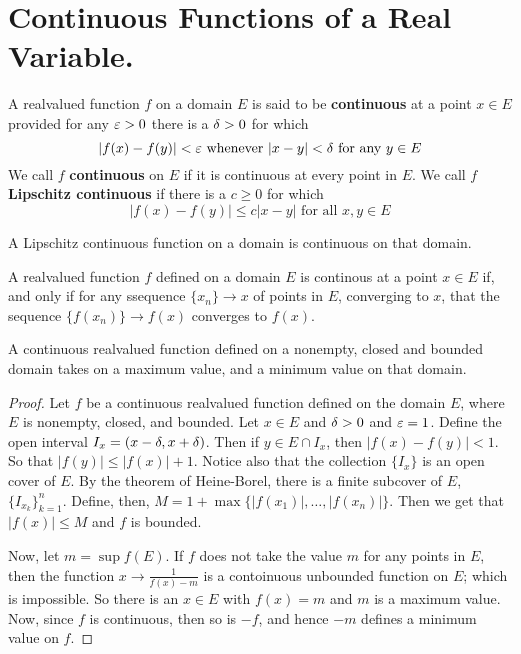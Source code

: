 \section{Continuous Functions of a Real Variable.}

\begin{definition}
    A realvalued function $f$ on a domain $E$ is said to be \textbf{continuous}
    at a point $x \in E$ provided for any $\varepsilon>0$ there is a  $\delta>0$ for which
    \begin{equation*}
        |f(x)-f(y)|<\varepsilon \text{ whenever } |x-y|<\delta \text{ for any } y \in E
    \end{equation*}
    We call $f$  \textbf{continuous} on $E$ if it is continuous at every point
    in  $E$. We call  $f$  \textbf{Lipschitz continuous} if there is a $c \geq
    0$ for which
    \begin{equation*}
        |f(x)-f(y)| \leq c|x-y| \text{ for all } x,y \in E
    \end{equation*}
\end{definition}

\begin{lemma}\label{1.3.1}
    A Lipschitz continuous function on a domain is continuous on that domain.
\end{lemma}

\begin{lemma}\label{1.3.2}
    A realvalued function $f$ defined on a domain  $E$ is continous at a point
    $x \in E$ if, and only if for any ssequence  $\{x_n\} \xrightarrow{} x$ of
    points in $E$, converging to  $x$, that the sequence $\{f(x_n)\} \xrightarrow{}
    f(x)$ converges to $f(x)$.
\end{lemma}

\begin{theorem}\label{1.3.3}
    A continuous realvalued function defined on a nonempty, closed and bounded
    domain takes on a maximum value, and a minimum value on that domain.
\end{theorem}
\begin{proof}
    Let $f$ be a continuous realvalued function defined on the domain  $E$,
    where $E$ is nonempty, closed, and bounded. Let $x \in E$ and  $\delta>0$ and
    $\varepsilon=1$. Define the open interval  $I_x=(x-\delta,x+\delta)$. Then if $y \in E \cap
    I_x$, then  $|f(x)-f(y)|<1$. So that $|f(y)| \leq |f(x)|+1$. Notice also
    that the collection $\{I_x\}$ is an open cover of $E$. By the theorem of
    Heine-Borel, there is a finite subcover of  $E$,  $\{I_{x_k}\}_{k=1}^n$.
    Define, then, $M=1+\max{\{|f(x_1)|, \dots, |f(x_n)|\}}$. Then we get that
    $|f(x)| \leq M$ and $f$ is bounded.

    Now, let  $m=\sup{f(E)}$. If $f$ does not take the value  $m$ for any points
    in  $E$, then the function  $x \xrightarrow{} \frac{1}{f(x)-m}$ is a
    contoinuous unbounded function on $E$; which is impossible. So there is an
    $x \in E$ with  $f(x)=m$ and $m$ is a maximum value. Now, since $f$ is
    continuous, then so is  $-f$, and hence  $-m$ defines a minimum value on $f$.
\end{proof}

